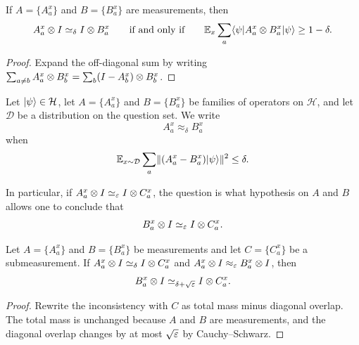 \begin{lemma}\label{prop:simeq-for-measurements}
	\leanok
	If $A=\{A_a^x\}$ and $B=\{B_a^x\}$ are measurements, then
	\[
		A_a^x \otimes I \simeq_\delta I \otimes B_a^x
		\qquad\text{if and only if}\qquad
		\mathbb{E}_x \sum_a \langle \psi \rvert A_a^x \otimes B_a^x \lvert \psi \rangle \ge 1-\delta.
	\]
\end{lemma}
\begin{proof}
	\leanok
	Expand the off-diagonal sum by writing $\sum_{a \ne b} A_a^x \otimes B_b^x = \sum_b (I-A_b^x) \otimes B_b^x$.
\end{proof}

\begin{definition}\label{def:approx_delta}
	\leanok
	Let $\lvert \psi \rangle \in \mathcal H$, let $A=\{A_a^x\}$ and $B=\{B_a^x\}$ be families of operators on $\mathcal H$, and let $\mathcal D$ be a distribution on the question set. We write
	\[
		A_a^x \approx_\delta B_a^x
	\]
	when
	\[
		\mathbb{E}_{x \sim \mathcal D} \sum_a \lVert (A_a^x-B_a^x)\lvert \psi \rangle \rVert^2 \le \delta.
	\]
\end{definition}

In particular, if $A^x_a \otimes I \simeq_{\varepsilon} I \otimes C^x_a$, the question is what hypothesis on $A$ and $B$ allows one to conclude that
\begin{equation}\label{eq:can-we-use-approx-delta-to-derive-this}
	B^x_a \otimes I \simeq_{\varepsilon} I \otimes C^x_a.
\end{equation}

\begin{lemma}\label{prop:triangle-sub}
	\leanok
	Let $A=\{A_a^x\}$ and $B=\{B_a^x\}$ be measurements and let $C=\{C_a^x\}$ be a submeasurement. If $A_a^x \otimes I \simeq_\delta I \otimes C_a^x$ and $A_a^x \otimes I \approx_\varepsilon B_a^x \otimes I$, then
	\[
		B_a^x \otimes I \simeq_{\delta+\sqrt{\varepsilon}} I \otimes C_a^x.
	\]
\end{lemma}
\begin{proof}
	\leanok
	Rewrite the inconsistency with $C$ as total mass minus diagonal overlap. The total mass is unchanged because $A$ and $B$ are measurements, and the diagonal overlap changes by at most $\sqrt{\varepsilon}$ by Cauchy--Schwarz.
\end{proof}

